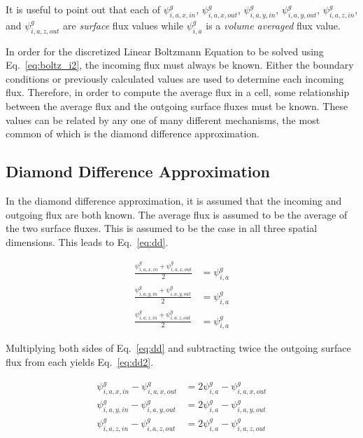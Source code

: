 It is useful to point out that each of $\psi_{i,a,x,in}^g$, $\psi_{i,a,x,out}^g$, $\psi_{i,a,y,in}^g$, $\psi_{i,a,y,out}^g$, $\psi_{i,a,z,in}^g$, and $\psi_{i,a,z,out}^g$ are \textit{surface} flux values while $\psi_{i,a}^{g}$ is a \textit{volume averaged} flux value.

In order for the discretized Linear Boltzmann Equation to be solved using Eq.~\ref{eq:boltz_i2}, the incoming flux must always be known. Either the boundary conditions or previously calculated values are used to determine each incoming flux. Therefore, in order to compute the average flux in a cell, some relationship between the average flux and the outgoing surface fluxes must be known. These values can be related by any one of many different mechanisms, the most common of which is the diamond difference approximation.

\subsection{Diamond Difference Approximation}

In the diamond difference approximation, it is assumed that the incoming and outgoing flux are both known. The average flux is assumed to be the average of the two surface fluxes. This is assumed to be the case in all three spatial dimensions. This leads to Eq.~\ref{eq:dd}.

\begin{equation} \label{eq:dd}
\begin{split}
\frac{\psi_{i,a,x,in}^g + \psi_{i,a,x,out}^g}{2} &= \psi_{i,a}^{g} \\
\frac{\psi_{i,a,y,in}^g + \psi_{i,a,y,out}^g}{2} &= \psi_{i,a}^{g} \\
\frac{\psi_{i,a,z,in}^g + \psi_{i,a,z,out}^g}{2} &= \psi_{i,a}^{g}
\end{split}
\end{equation}

Multiplying both sides of Eq.~\ref{eq:dd} and subtracting twice the outgoing surface flux from each yields Eq.~\ref{eq:dd2}.

\begin{equation} \label{eq:dd2}
\begin{split}
\psi_{i,a,x,in}^g - \psi_{i,a,x,out}^g &= 2\psi_{i,a}^{g} - \psi_{i,a,x,out}^g \\
\psi_{i,a,y,in}^g - \psi_{i,a,y,out}^g &= 2\psi_{i,a}^{g} - \psi_{i,a,y,out}^g \\
\psi_{i,a,z,in}^g - \psi_{i,a,z,out}^g &= 2\psi_{i,a}^{g} - \psi_{i,a,z,out}^g
\end{split}
\end{equation}

